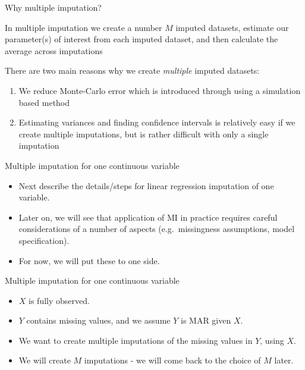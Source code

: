 \documentclass[ignorenonframetext,]{beamer}
\providecommand{\tightlist}{%
  \setlength{\itemsep}{0pt}\setlength{\parskip}{0pt}}
\begin{document}
\begin{frame}{Why multiple imputation?}
\protect\hypertarget{why-multiple-imputation}{}

In multiple imputation we create a number \(M\) imputed datasets,
estimate our parameter(s) of interest from each imputed dataset, and
then calculate the average across imputations

There are two main reasons why we create \emph{multiple} imputed
datasets:

\begin{enumerate}
\tightlist
\item
  We reduce Monte-Carlo error which is introduced through using a
  simulation based method
\item
  Estimating variances and finding confidence intervals is relatively
  easy if we create multiple imputations, but is rather difficult with
  only a single imputation
\end{enumerate}

\end{frame}

\begin{frame}{Multiple imputation for one continuous variable}
\protect\hypertarget{multiple-imputation-for-one-continuous-variable}{}

\begin{itemize}
\tightlist
\item
  Next describe the details/steps for linear regression imputation of
  one variable.
\item
  Later on, we will see that application of MI in practice requires
  careful considerations of a number of aspects (e.g.~missingness
  assumptions, model specification).
\item
  For now, we will put these to one side.
\end{itemize}

\end{frame}

\begin{frame}{Multiple imputation for one continuous variable}
\protect\hypertarget{multiple-imputation-for-one-continuous-variable-1}{}

\begin{itemize}
\tightlist
\item
  \(X\) is fully observed.
\item
  \(Y\) contains missing values, and we assume \(Y\) is MAR given \(X\).
\item
  We want to create multiple imputations of the missing values in \(Y\),
  using \(X\).
\item
  We will create \(M\) imputations - we will come back to the choice of
  \(M\) later.
\end{itemize}

\end{frame}
\end{document}
